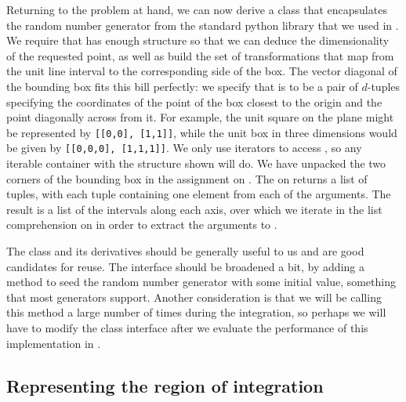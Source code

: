 Returning to the problem at hand, we can now derive a class  that
encapsulates the random number generator from the standard python library that we used in
. We require that  has enough structure so that we can
deduce the dimensionality of the requested point, as well as build the set of transformations
that map from the unit line interval to the corresponding side of the box. The vector diagonal
of the bounding box fits this bill perfectly: we specify that  is to be a pair
of $d$-tuples specifying the coordinates of the point of the box closest to the origin and the
point diagonally across from it. For example, the unit square on the plane might be represented
by \mbox{\tt [[0,0], [1,1]]}, while the unit box in three dimensions would be given by
\mbox{\tt [[0,0,0], [1,1,1]]}.  We only use iterators to access , so any
iterable container with the structure shown will do.
%
%
We have unpacked the two corners of the bounding box in the assignment on
.  The  on  returns a list of tuples,
with each tuple containing one element from each of the arguments. The result is a list of the
intervals along each axis, over which we iterate in the list comprehension on
 in order to extract the arguments to .

The class  and its derivatives should be generally useful to us and are good
candidates for reuse. The interface should be broadened a bit, by adding a method to seed
the random number generator with some initial value, something that most generators support.
Another consideration is that we will be calling this method a large number of times during the
integration, so perhaps we will have to modify the class interface after we evaluate the
performance of this implementation in .


\subsection{Representing the region of integration}
\label{sec:classes:region}

